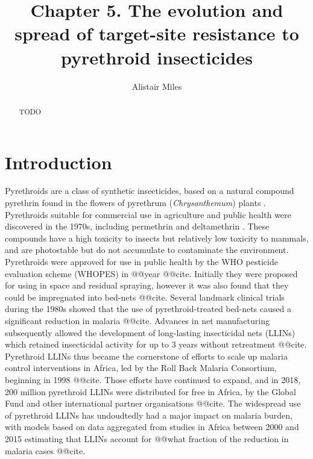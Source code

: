 \documentclass[a4paper,11pt,abstracton,hidelinks]{scrartcl}
\title{Chapter 5. The evolution and spread of target-site resistance to pyrethroid insecticides}
\author[1,2]{\small Alistair Miles}
\affil[1]{\footnotesize Big Data Institute, University of Oxford, Li Ka Shing Centre for Health Information and Discovery, Old Road Campus, Oxford OX3 7LF}
\affil[2]{\footnotesize Wellcome Sanger Institute, Hinxton, Cambridge CB10 1SA}
\begin{document}
\maketitle


\begin{abstract}


TODO


\end{abstract}


\section*{Introduction}


Pyrethroids are a class of synthetic insecticides, based on a natural compound pyrethrin found in the flowers of pyrethrum (\textit{Chrysanthemum}) plants \parencite{Elliott1989}.
%
Pyrethroids suitable for commercial use in agriculture and public health were discovered in the 1970s, including permethrin \parencite{Elliott1973} and deltamethrin \parencite{Elliott1974}.
%
These compounds have a high toxicity to insects but relatively low toxicity to mammals, and are photostable but do not accumulate to contaminate the environment.
%
Pyrethroids were approved for use in public health by the WHO pesticide evaluation scheme (WHOPES) in @@year @@cite.
%
Initially they were proposed for using in space and residual spraying, however it was also found that they could be impregnated into bed-nets @@cite.
%
Several landmark clinical trials during the 1980s showed that the use of pyrethroid-treated bed-nets caused a significant reduction in malaria @@cite.
%
Advances in net manufacturing subsequently allowed the development of long-lasting insecticidal nets (LLINs) which retained insecticidal activity for up to 3 years without retreatment @@cite.
%
Pyrethroid LLINs thus became the cornerstone of efforts to scale up malaria control interventions in Africa, led by the Roll Back Malaria Consortium, beginning in 1998 @@cite.
%
Those efforts have continued to expand, and in 2018, 200 million pyrethroid LLINs were distributed for free in Africa, by the Global Fund and other international partner organisations @@cite.
%
The widespread use of pyrethroid LLINs has undoudtedly had a major impact on malaria burden, with models based on data aggregated from studies in Africa between 2000 and 2015 estimating that LLINs account for @@what fraction of the reduction in malaria cases @@cite.
\end{document}
